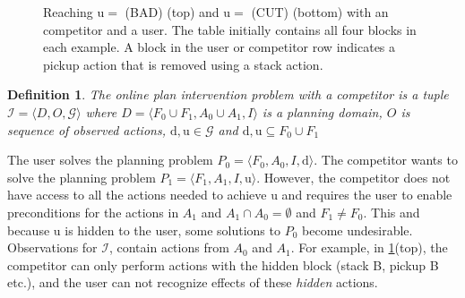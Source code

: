 \documentclass[letterpaper]{article}
\theoremstyle{plain}
\newtheorem{definition}{Definition}
\begin{document}
\begin{figure}[t]
        \caption{Reaching $\mathrm{u}= $ (BAD) (top) and $\mathrm{u}= $ (CUT) (bottom) with an competitor and a user.  The table initially contains all four blocks in each example. A block in the user or competitor row indicates a pickup action that is removed using a stack action.}
        \label{fig:multi}
\end{figure}

\begin{definition}
The \textnormal{online plan intervention problem} with a competitor is a tuple $\mathcal{I} = \langle D, O, \mathcal{G} \rangle$ where $D=\langle F_0\cup F_1, A_0\cup A_1, I \rangle$ is a planning domain, 
$O$ is  sequence of observed actions, $\mathrm{d},\mathrm{u} \in \mathcal{G}$ and 
$\mathrm{d}, \mathrm{u} \subseteq F_0\cup F_1$
\end{definition}
The user solves the planning problem $P_0=\langle F_0, A_0, I,\mathrm{d}\rangle$.
The competitor wants to solve the planning problem $P_1=\langle F_1, A_1, I,\mathrm{u}\rangle$.
However, the competitor does not have access to all the actions needed to achieve $\mathrm{u}$ and requires the user to enable preconditions for the actions in $A_1$ and $A_1 \cap A_0=\emptyset$ and $F_1 \neq F_0$. This and because $\mathrm{u}$ is hidden to the user, some solutions to $P_0$ become undesirable.
Observations for $\mathcal{I}$, contain actions from $A_0$ and $A_1$.
For example, in \ref{fig:multi}(top), the competitor can only perform actions with the hidden block (stack B, pickup B etc.), and the user can not recognize effects of these \textit{hidden} actions. 
\end{document}

